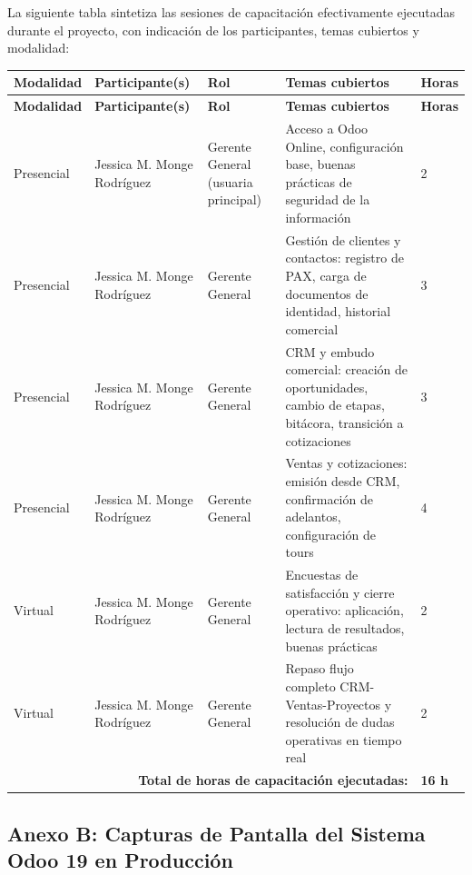 \begin{indentedsubsection}
La siguiente tabla sintetiza las sesiones de capacitación efectivamente ejecutadas durante el proyecto, con indicación de los participantes, temas cubiertos y modalidad:

\renewcommand{\arraystretch}{1.35}
\begin{longtable}{|p{2.2cm}|p{3.0cm}|p{2.5cm}|p{5.0cm}|p{1.5cm}|}
\hline
\textbf{Modalidad} & \textbf{Participante(s)} & \textbf{Rol} & \textbf{Temas cubiertos} & \textbf{Horas} \\ \hline
\endfirsthead
\hline
\textbf{Modalidad} & \textbf{Participante(s)} & \textbf{Rol} & \textbf{Temas cubiertos} & \textbf{Horas} \\ \hline
\endhead
Presencial & Jessica M. Monge Rodríguez & Gerente General (usuaria principal) & Acceso a Odoo Online, configuración base, buenas prácticas de seguridad de la información & 2 \\ \hline
Presencial & Jessica M. Monge Rodríguez & Gerente General & Gestión de clientes y contactos: registro de PAX, carga de documentos de identidad, historial comercial & 3 \\ \hline
Presencial & Jessica M. Monge Rodríguez & Gerente General & CRM y embudo comercial: creación de oportunidades, cambio de etapas, bitácora, transición a cotizaciones & 3 \\ \hline
Presencial & Jessica M. Monge Rodríguez & Gerente General & Ventas y cotizaciones: emisión desde CRM, confirmación de adelantos, configuración de tours & 4 \\ \hline
Virtual & Jessica M. Monge Rodríguez & Gerente General & Encuestas de satisfacción y cierre operativo: aplicación, lectura de resultados, buenas prácticas & 2 \\ \hline
Virtual & Jessica M. Monge Rodríguez & Gerente General & Repaso flujo completo CRM-Ventas-Proyectos y resolución de dudas operativas en tiempo real & 2 \\ \hline
\multicolumn{4}{|r|}{\textbf{Total de horas de capacitación ejecutadas:}} & \textbf{16 h} \\ \hline
\end{longtable}

\end{indentedsubsection}

\newpage
\subsection{Anexo B: Capturas de Pantalla del Sistema Odoo 19 en Producción}

